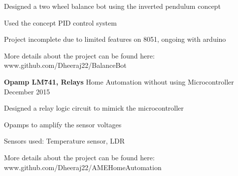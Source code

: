 \begin{cventries}
{\begin{cvitems}
        \item {Designed a two wheel balance bot using the inverted pendulum concept}
         \item {Used the concept PID control system}
         \item {Project incomplete due to limited features on 8051, ongoing with arduino}
         \item {More details about the project can be found here: \textcolor{awesome-emerald}{www.github.com/Dheeraj22/BalanceBot}}
      \end{cvitems}
    }
    \cventry
    {\textbf{Opamp LM741, Relays}}
    {Home Automation without using Microcontroller}
    {}
    {December 2015}
    {
      \begin{cvitems}
        \item {Designed a relay logic circuit to mimick the microcontroller}
         \item {Opamps to amplify the sensor voltages}
         \item {Sensors used: Temperature sensor, LDR}
         \item {More details about the project can be found here: \textcolor{awesome-emerald}{www.github.com/Dheeraj22/AMEHomeAutomation}}
      \end{cvitems}
    }
\end{cventries}
